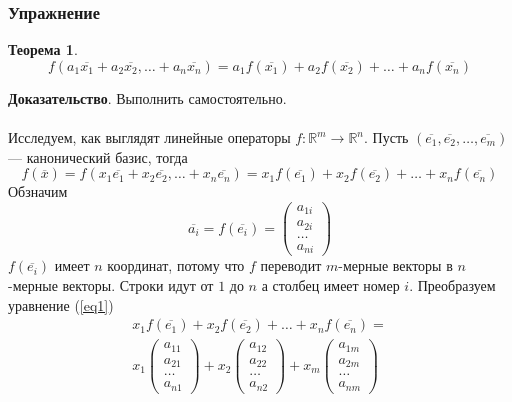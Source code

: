 \documentclass[]{article}
\newtheorem{thr}{Теорема}
\begin{document}
	\subsubsection{Упражнение}
	\begin{thr}
		\begin{equation}
			f(a_1\overline{x_1}+ a_2\overline{x_2},\ldots+ a_n\overline{x_n})
			=
			a_1f(\overline{x_1})+ a_2f(\overline{x_2})+\ldots+ a_nf(\overline{x_n})
		\end{equation}
	\end{thr}
	\textbf{Доказательство}. Выполнить самостоятельно.
	\\
	\\
	Исследуем, как выглядят линейные операторы $f:\mathbb{R}^m\rightarrow\mathbb{R}^n$. Пусть $(\overline{e_1}, \overline{e_2}, \ldots, \overline{e_m})$ --- канонический базис, тогда 
		\begin{equation}\label{eq1}
			f(\overline{x})=
	f(x_1\overline{e_1}+ x_2\overline{e_2},\ldots+ x_n\overline{e_n})
	=
	x_1f(\overline{e_1})+ x_2f(\overline{e_2})+\ldots+ x_nf(\overline{e_n})
\end{equation}
	 Обзначим
	 \begin{equation}
	 	\overline{a_i}=
	 	f(\overline{e_i})=
	 	\begin{pmatrix}
	 		a_{1i}
	 		\\
	 		a_{2i}
	 		\\
	 		\ldots
	 		\\
			a_{ni}
	 	\end{pmatrix}
	 \end{equation}
	 $f(\overline{e_i})$ имеет $n$ координат, потому что $f$ переводит $m$-мерные векторы в $n$-мерные векторы. Строки идут от $1$ до $n$ а столбец имеет номер $i$. Преобразуем уравнение (\ref{eq1})
	 \begin{gather*}
	 	x_1f(\overline{e_1})+ x_2f(\overline{e_2})+\ldots+ x_nf(\overline{e_n})
	 	=
	 	\\
	 	x_1
	 	\begin{pmatrix}
	 		a_{11}
	 		\\
	 		a_{21}
	 		\\
	 		\ldots
	 		\\
	 		a_{n1}
	 	\end{pmatrix}
	 	+
	 	x_2
	 	\begin{pmatrix}
	 		a_{12}
	 		\\
	 		a_{22}
	 		\\
	 		\ldots
	 		\\
	 		a_{n2}
	 	\end{pmatrix}
	 	+
x_m
\begin{pmatrix}
	a_{1m}
	\\
	a_{2m}
	\\
	\ldots
	\\
	a_{nm}
\end{pmatrix}
	 \end{gather*}
\end{document}
